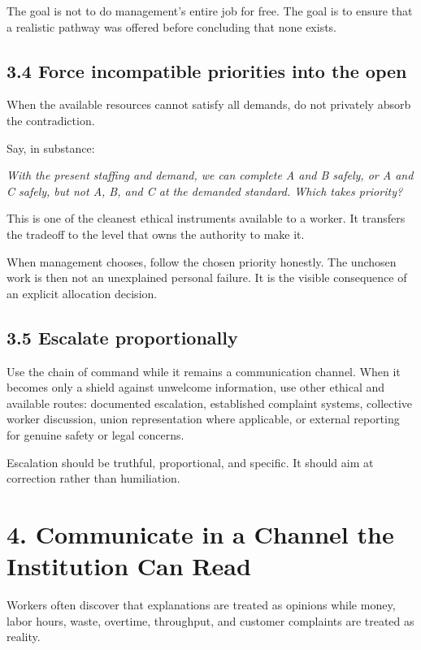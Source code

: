 \documentclass[11pt,oneside]{article}
\renewenvironment{quote}
  {\begin{tcolorbox}[
      enhanced,
      breakable,
      colback=ManifestLight,
      colframe=ManifestRule,
      boxrule=0pt,
      leftrule=3pt,
      arc=0pt,
      outer arc=0pt,
      left=10pt,right=10pt,top=8pt,bottom=8pt,
      before skip=0.8em,after skip=0.8em
    ]\itshape}
  {\end{tcolorbox}}
\begin{document}
The goal is not to do management's entire job for free. The goal is to
ensure that a realistic pathway was offered before concluding that none
exists.

\subsection{3.4 Force incompatible priorities into the
open}\label{force-incompatible-priorities-into-the-open}

When the available resources cannot satisfy all demands, do not
privately absorb the contradiction.

Say, in substance:

\begin{quote}
With the present staffing and demand, we can complete A and B safely, or
A and C safely, but not A, B, and C at the demanded standard. Which
takes priority?
\end{quote}

This is one of the cleanest ethical instruments available to a worker.
It transfers the tradeoff to the level that owns the authority to make
it.

When management chooses, follow the chosen priority honestly. The
unchosen work is then not an unexplained personal failure. It is the
visible consequence of an explicit allocation decision.

\subsection{3.5 Escalate proportionally}\label{escalate-proportionally}

Use the chain of command while it remains a communication channel. When
it becomes only a shield against unwelcome information, use other
ethical and available routes: documented escalation, established
complaint systems, collective worker discussion, union representation
where applicable, or external reporting for genuine safety or legal
concerns.

Escalation should be truthful, proportional, and specific. It should aim
at correction rather than humiliation.

\section{4. Communicate in a Channel the Institution Can
Read}\label{communicate-in-a-channel-the-institution-can-read}

Workers often discover that explanations are treated as opinions while
money, labor hours, waste, overtime, throughput, and customer complaints
are treated as reality.
\end{document}
